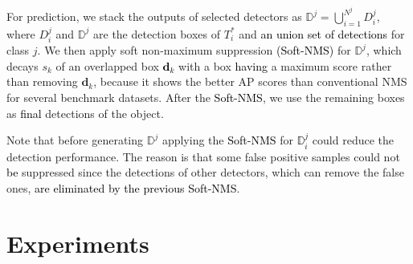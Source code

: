 \documentclass[10pt,twocolumn,letterpaper]{article}
\newcommand{\RV}{\textcolor{black}}
\begin{document}
For prediction, we  stack the outputs of selected detectors  as $\mathbb{D}^{j}= \bigcup_{i=1}^{N^{j}} D_{i}^{j}$, where  $D_{i}^{j}$ and $\mathbb{D}^{j}$ are the detection boxes of $T^{*}_{i}$ and \RV{an union set of  detections} for class $j$. We then apply soft non-maximum suppression \RV{(Soft-NMS)} \cite{BodlaSCD_CORR17} for $\mathbb{D}^{j}$, which decays $s_k$ of an overlapped box \RV{$\mathbf{d}_k$} with a box \RV{having} a maximum score rather than removing $\mathbf{d}_k$, because it shows the better AP scores than conventional NMS for several benchmark datasets. After the \RV{Soft-NMS}, we use the remaining boxes as \RV{final} detections of the object.

Note that before generating  $\mathbb{D}^{j}$ applying the \RV{Soft-NMS} for \RV{$\mathbb{D}_{i}^{j}$} could reduce the detection performance. The reason is that some false positive samples could not \RV{be} suppressed since the detections of other detectors, which can remove the false ones, \RV{are eliminated by the previous Soft-NMS}.

%   


\section{Experiments}

\label{Exp}
\end{document}

